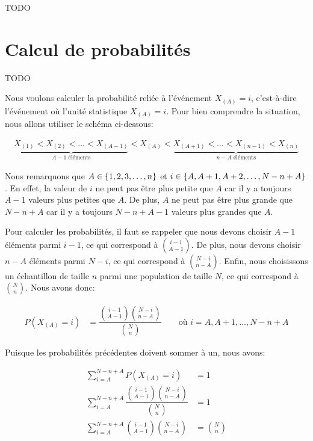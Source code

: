 \documentclass[10pt]{article}
\begin{document}
TODO

\section{\texorpdfstring{Calcul de probabilités
\label{calculs_proba}}{Calcul de probabilités }}\label{calcul-de-probabilites}

TODO

Nous voulons calculer la probabilité reliée à l'événement \(X_{(A)}=i\),
c'est-à-dire l'événement où l'unité statistique \(X_{(A)}=i\). Pour bien
comprendre la situation, nous allons utiliser le schéma ci-dessous:

\begin{align*}
\underbrace{X_{(1)} <  X_{(2)} < \ldots < X_{(A-1)}}_{A-1 \text{ éléments}} 
< X_{(A)} 
< \underbrace{X_{(A+1)} < \ldots < X_{(n-1)} < X_{(n)}}_{n-A \text{ éléments}}
\end{align*}

Nous remarquons que \(A\in\left\{1,2,3,\ldots, n\right\}\) et
\(i\in\left\{A,A+1,A+2,\ldots,N-n+A\right\}\). En effet, la valeur de \(i\) ne
peut pas être plus petite que \(A\) car il y a toujours \(A-1\) valeurs
plus petites que \(A\). De plus, \(A\) ne peut pas être plus grande que
\(N-n+A\) car il y a toujours \(N-n+A-1\) valeurs plus grandes que
\(A\).

Pour calculer les probabilités, il faut se rappeler que nous devons
choisir \(A-1\) éléments parmi \(i-1\), ce qui correspond à
\(\binom{i-1}{A-1}\). De plus, nous devons choisir \(n-A\) éléments
parmi \(N-i\), ce qui correspond à \(\binom{N-i}{n-A}\). Enfin, nous
choisissons un échantillon de taille \(n\) parmi une population de
taille \(N\), ce qui correspond à \(\binom{N}{n}\). Nous avons donc:

\begin{align*}
P(X_{(A)}=i) &= \dfrac{\binom{i-1}{A-1}\binom{N-i}{n-A}}{\binom{N}{n}} \qquad \text{où } i=A,A+1,\ldots,N-n+A
\end{align*}

Puisque les probabilités précédentes doivent sommer à un, nous avons:

\begin{align}
\sum_{i=A}^{N-n+A} P(X_{(A)}=i) &= 1 \nonumber\\
\sum_{i=A}^{N-n+A} \dfrac{\binom{i-1}{A-1}\binom{N-i}{n-A}}{\binom{N}{n}} &= 1 \nonumber\\
\sum_{i=A}^{N-n+A} \binom{i-1}{A-1}\binom{N-i}{n-A} &= \binom{N}{n} \label{eq:sumxA}
\end{align}
\end{document}
